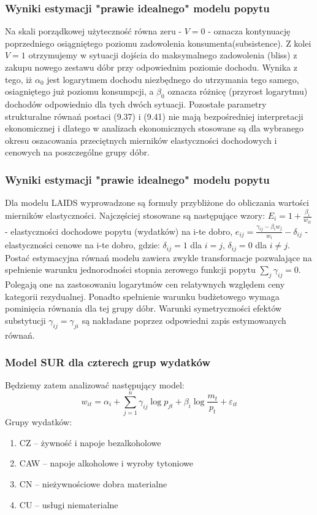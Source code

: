 \documentclass[11pt,usenames,dvipsnames,svgnames,x11names]{beamer}\usepackage[]{graphicx}\usepackage[]{color}
\theoremstyle{definition}
\theoremstyle{remark}
\begin{document}
\begin{frame}
\frametitle{Wyniki estymacji "prawie idealnego" modelu popytu }
Na skali porządkowej użyteczność równa zeru - $V=0$ - oznacza kontynuację poprzedniego osiągniętego poziomu zadowolenia konsumenta(subsistence). Z kolei $V=1$ otrzymujemy w sytuacji dojścia do maksymalnego zadowolenia (bliss) z zakupu nowego zestawu dóbr przy odpowiednim poziomie dochodu. Wynika z tego, iż $\alpha_{0}$ jest logarytmem dochodu niezbędnego do utrzymania tego samego, osiagniętego już poziomu konsumpcji, a $\beta_{0}$ oznacza różnicę (przyrost logarytmu) dochodów odpowiednio dla tych dwóch sytuacji. Pozostałe parametry strukturalne równań postaci (9.37) i (9.41) nie mają bezpośredniej interpretacji ekonomicznej i dlatego w analizach ekonomicznych stosowane są dla wybranego okresu oszacowania przeciętnych mierników elastyczności dochodowych i cenowych na poszczególne grupy dóbr. 
\end{frame}

\begin{frame}
\frametitle{Wyniki estymacji "prawie idealnego" modelu popytu }
Dla modelu LAIDS wyprowadzone są formuły przybliżone do obliczania wartości mierników elastyczności. Najczęściej stosowane są następujące wzory: \newline 
$ E_{i} = 1 + \frac{\beta_{i}}{w_{it}} $ - elastyczności dochodowe popytu (wydatków) na i-te dobro,
$ e_{ij} = \frac{\gamma_{ij} - \beta_{i}w_{j}}{w_{i}} - \delta_{ij} $ - elastyczności cenowe na i-te dobro, \newline
gdzie: $\delta_{ij} =1$ dla $i=j$, $\delta_{ij} = 0$ dla $i \neq j.$ \newline
Postać estymacyjna równań modelu zawiera zwykle transformacje pozwalające na spełnienie warunku jednorodności stopnia zerowego funkcji popytu $ \sum\limits_{j} \gamma_{ij} = 0.$ Polegają one na zastosowaniu logarytmów cen relatywnych względem ceny kategorii rezydualnej. Ponadto spełnienie warunku budżetowego wymaga pominięcia równania dla tej grupy dóbr. Warunki symetryczności efektów substytucji $\gamma_{ij} = \gamma_{ji}$ są nakładane poprzez odpowiedni zapis estymowanych równań.
\end{frame}



\begin{frame}
\frametitle{Model SUR dla czterech grup wydatków}

Będziemy zatem analizować następujący model:
$$
w_{it}=\alpha_i+\sum_{j=1}^n\gamma_{ij}\log p_{jt}+\beta_i\log\dfrac{m_t}{p_t}+\varepsilon_{it}
$$
Grupy wydatków:
\begin{enumerate}
\item[] CZ -- żywność i napoje bezalkoholowe
\item[] CAW -- napoje alkoholowe i wyroby tytoniowe
\item[] CN -- nieżywnościowe dobra materialne
\item[] CU -- usługi niematerialne 
\end{enumerate}
\end{frame}
\end{document}
